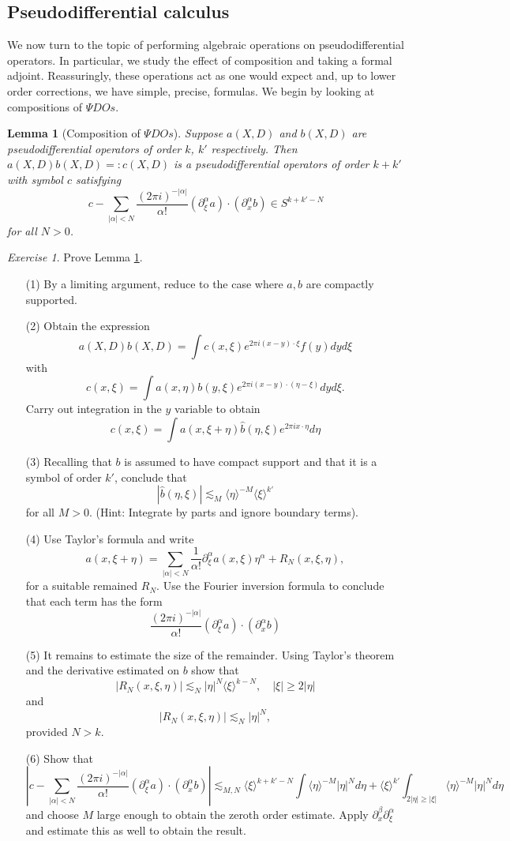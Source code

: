 \documentclass[11pt]{article}
\newtheorem{lem}[thm]{Lemma}
\theoremstyle{remark}
\newtheorem{exr}{Exercise}
\newcommand{\1}{\textbf{1}}
\newcommand{\lle}{\lesssim}
\def\brac#1{\langle #1  \rangle}
\begin{document}
\subsection*{Pseudodifferential calculus}
We now turn to the topic of performing algebraic operations on pseudodifferential operators. In particular, we study the effect of composition and taking a formal adjoint. Reassuringly, these operations act as one would expect and, up to lower order corrections, we have simple, precise, formulas. We begin by looking at compositions of $\Psi DOs$.
\begin{lem}[Composition of $\Psi DOs$]
Suppose $a(X,D)$ and $b(X,D)$ are pseudodifferential operators of order $k$, $k'$ respectively. Then $a(X,D)b(X,D) =: c(X,D)$ is a pseudodifferential operators of order $k + k'$ with symbol $c$ satisfying
\[
c - \sum_{|\alpha| < N} \frac{(2\pi i)^{-|\alpha|}}{\alpha!} (\partial_\xi^\alpha a) \cdot( \partial_x^\alpha b) \in S^{k + k' - N}
\]
for all $N > 0$.
\label{lem:comp}
\end{lem}
\begin{exr}
Prove Lemma \ref{lem:comp}.
\begin{enumerate}
\item[(1)] By a limiting argument, reduce to the case where $a,b$ are compactly supported.
\item[(2)] Obtain the expression
\[
a(X,D)b(X,D) = \int c(x, \xi) e^{2 \pi i (x-y) \cdot \xi} f(y) dy d\xi
\]
with
\[
c(x, \xi) = \int a(x,\eta ) b(y,\xi) e^{2 \pi i (x-y) \cdot (\eta - \xi)} dy d\xi.
\]
Carry out integration in the $y$ variable to obtain
\[
c(x, \xi) = \int a(x, \xi+ \eta) \hat{b}(\eta,\xi) e^{2 \pi i x \cdot \eta} d\eta
\]
\item[(3)] Recalling that $b$ is assumed to have compact support and that it is a symbol of order $k'$, conclude that
\[
|\hat{b}(\eta,\xi)| \lle_{M} \brac{\eta}^{-M} \brac{\xi}^{k'}
\]
for all $M > 0$. (Hint: Integrate by parts and ignore boundary terms).
\item[(4)] Use Taylor's formula and write
\[
a(x, \xi+ \eta) = \sum_{|\alpha| < N} \frac{1}{\alpha!} \partial_\xi^\alpha a(x,\xi)\eta^\alpha  + R_N(x,\xi,\eta),
\]
for a suitable remained $R_N$. Use the Fourier inversion formula to conclude that each term has the form
\[
\frac{(2\pi i)^{-|\alpha|}}{\alpha!} (\partial_\xi^\alpha a) \cdot( \partial_x^\alpha b)
\]
\item[(5)] It remains to estimate the size of the remainder. Using Taylor's theorem and the derivative estimated on $b$ show that
\[
|R_N(x,\xi,\eta)| \lle_N |\eta|^N \brac{\xi}^{k-N}, \quad |\xi| \geq 2 |\eta|
\]
and
\[
|R_N(x,\xi,\eta)| \lle_N |\eta|^N,
\]
provided $N > k$.
\item[(6)] Show that 
\[
\left|c - \sum_{|\alpha| < N} \frac{(2\pi i)^{-|\alpha|}}{\alpha!} (\partial_\xi^\alpha a) \cdot( \partial_x^\alpha b)\right| \lle_{M,N} \brac{\xi}^{k+k' - N} \int \brac{\eta}^{-M} |\eta|^N d\eta + \brac{\xi}^{k'} \int_{2|\eta| \geq |\xi|}  \brac{\eta}^{-M} |\eta|^N d\eta
\]
and choose $M$ large enough to obtain the zeroth order estimate. Apply $\partial_x^\beta \partial_\xi^\alpha$ and estimate this as well to obtain the result.
\end{enumerate}
\end{exr}
\end{document}
